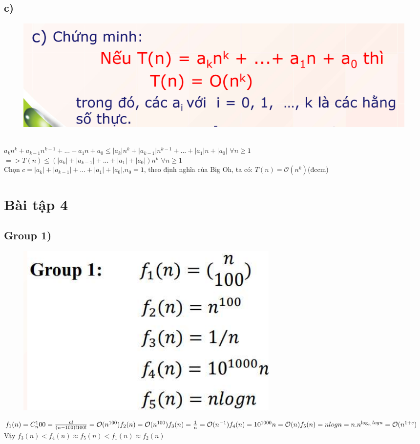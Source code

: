 \documentclass[10pt,a4paper]{article}
\begin{document}
\subsection*{c)}
\begin{figure}[H]
    \centering
    \includegraphics[scale=0.8]{images/3c.png}
\end{figure}
\\
$a_kn^k+a_{k-1}n^{k-1}+...+a_1n+a_0 \leq |a_k|n^k + |a_{k-1}|n^{k-1} + ...+|a_1|n+|a_0|$ $\forall n \geq 1$ \\
$=> T(n) \leq (|a_k| + |a_{k-1}| + ...+|a_1| + |a_0|)n^k$ $\forall n \geq 1$ \\
Chọn $c = |a_k| + |a_{k-1}| + ...+|a_1| + |a_0| $,$n_0 = 1$, theo định nghĩa của Big Oh, ta có: $T(n) = \mathcal{O}(n^k)$(đccm)
\section*{Bài tập 4} 
\subsection*{Group 1)}
\begin{figure}[H]
    \centering
    \includegraphics[scale=.8]{images/4.1.png}
\end{figure}
$f_1(n) = C_n^100 = \frac{n!}{(n-100)!100!} = \mathcal{O}(n^{100})\\
f_2(n) =  \mathcal{O}(n^{100})\\
f_3(n) = \frac{1}{n} =  \mathcal{O}(n^{-1})\\
f_4(n) = 10^{1000}n = \mathcal{O}(n)\\
f_5(n) = nlogn = n.n^{\log_n{logn}} = \mathcal{O}(n^{1+c})$\\
Vậy $f_3(n) < f_4(n) \approx f_5(n) < f_1(n) \approx f_2(n)$
\end{document}

